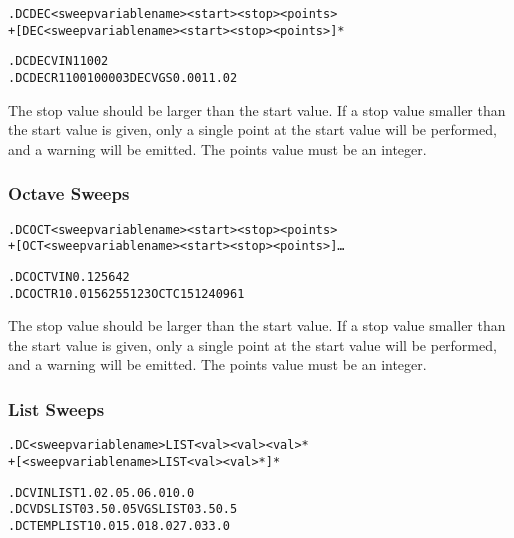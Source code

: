 \begin{Command}
\format
\begin{alltt}
.DC DEC <sweep variable name> <start> <stop> <points>
+ [DEC <sweep variable name> <start> <stop> <points>]*
\end{alltt}

\examples
\begin{alltt}
.DC DEC VIN 1 100 2 
.DC DEC R1 100 10000 3 DEC VGS 0.001 1.0 2
\end{alltt}

\comments
The stop value should be larger than the start value.  If a stop value
smaller than the start value is given, only a single point at the
start value will be performed, and a warning will be emitted.  The
points value must be an integer.

\end{Command}

\subsubsection{Octave Sweeps}
 

\begin{Command}
\format
\begin{alltt}
.DC OCT <sweep variable name> <start> <stop> <points>
+ [OCT <sweep variable name><start> <stop> <points>]\ldots 
\end{alltt}

\examples
\begin{alltt}
.DC OCT VIN 0.125 64 2 
.DC OCT R1 0.015625 512 3 OCT C1 512 4096 1
\end{alltt}

\comments
The stop value should be larger than the start value.  If a stop value
smaller than the start value is given, only a single point at the
start value will be performed, and a warning will be emitted.  The
points value must be an integer.

\end{Command}

\subsubsection{List Sweeps}
 

\begin{Command}
\format
\begin{alltt}
.DC <sweep variable name> LIST <val> <val> <val>*
+ [ <sweep variable name> LIST <val> <val>* ]*
\end{alltt}

\examples
\begin{alltt}
.DC VIN LIST 1.0 2.0 5.0 6.0 10.0 
.DC VDS LIST 0 3.5 0.05 VGS LIST 0 3.5 0.5
.DC TEMP LIST 10.0 15.0 18.0 27.0 33.0
\end{alltt}

\end{Command}



